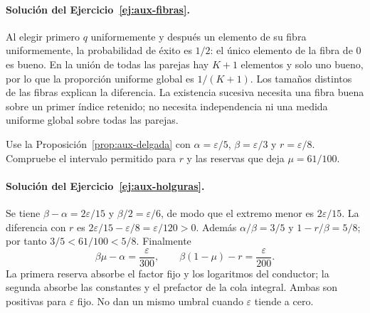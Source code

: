\paragraph{Solución del Ejercicio~\ref{ej:aux-fibras}.}
Al elegir primero $q$ uniformemente y después un elemento de su
fibra uniformemente, la probabilidad de éxito es $1/2$:
el único elemento de la fibra de $0$ es bueno.
En la unión de todas las parejas hay $K+1$ elementos y solo uno
bueno, por lo que la proporción uniforme global es $1/(K+1)$.
Los tamaños distintos de las fibras explican la diferencia.
La existencia sucesiva necesita una fibra buena sobre un primer
índice retenido; no necesita independencia ni una medida uniforme
global sobre todas las parejas.

\begin{ejercicio}\label{ej:aux-holguras}
Use la Proposición~\ref{prop:aux-delgada} con
$\alpha=\varepsilon/5$, $\beta=\varepsilon/3$ y
$r=\varepsilon/8$. Compruebe el intervalo permitido para $r$
y las reservas que deja $\mu=61/100$.
\end{ejercicio}

\paragraph{Solución del Ejercicio~\ref{ej:aux-holguras}.}
Se tiene $\beta-\alpha=2\varepsilon/15$ y
$\beta/2=\varepsilon/6$, de modo que el extremo menor es
$2\varepsilon/15$. La diferencia con $r$ es
$2\varepsilon/15-\varepsilon/8=\varepsilon/120>0$.
Además $\alpha/\beta=3/5$ y $1-r/\beta=5/8$;
por tanto $3/5<61/100<5/8$. Finalmente
\[
 \beta\mu-\alpha=\frac{\varepsilon}{300},\qquad
 \beta(1-\mu)-r=\frac{\varepsilon}{200}.
\]
La primera reserva absorbe el factor fijo y los logaritmos del
conductor; la segunda absorbe las constantes y el prefactor de
la cola integral. Ambas son positivas para $\varepsilon$ fijo.
No dan un mismo umbral cuando $\varepsilon$ tiende a cero.
